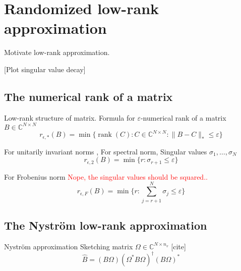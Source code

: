 \chapter{Randomized low-rank approximation}
\label{chp:3-nystrom}

Motivate low-rank approximation.

[Plot singular value decay]


\section{The numerical rank of a matrix}
\label{sec:3-nystrom-numerical-rank}

Low-rank structure of matrix.
Formula for $\varepsilon$-numerical rank \cite[Definition~1.1]{noga2013rank} of a matrix $B \in \mathbb{C}^{N \times N}$
\begin{equation}
    r_{\epsilon, \ast}(B) = \min \{\operatorname{rank}(C): C \in \mathbb{C}^{N \times N}: \lVert B - C \rVert_{\ast} \leq \varepsilon \}
    \label{equ:3-nystrom-SS-def-numerical-low-rank}
\end{equation}

For unitarily invariant norms \cite[Theorem~5]{mirsky1960truncation},
For spectral norm,
Singular values $\sigma_1, \dots, \sigma_N$
\begin{equation}
    r_{\epsilon, 2}(B) = \min \{r: \sigma_{r+1} \leq \varepsilon \}
    \label{equ:3-nystrom-SS-def-numerical-low-rank-spectral-norm}
\end{equation}

For Frobenius norm \textcolor{red}{Nope, the singular values should be squared..}
\begin{equation}
    r_{\epsilon, F}(B) = \min \{r: \sum_{j=r+1}^N \sigma_{j} \leq \varepsilon \}
    \label{equ:3-nystrom-SS-def-numerical-low-rank-frobenius-norm}
\end{equation}


\section{The Nystr\"om low-rank approximation}
\label{sec:3-nystrom-nystrom}

Nyström approximation \cite{gittens2013nystrom}
Sketching matrix $\Omega \in \mathbb{C}^{N \times n_v}$ [cite]
\begin{equation}
    \widehat{B} = (B \Omega) (\Omega^{\ast} B \Omega)^{\dagger} (B \Omega)^{\ast}
    \label{equ:3-nystrom-SS-nystrom}
\end{equation}

